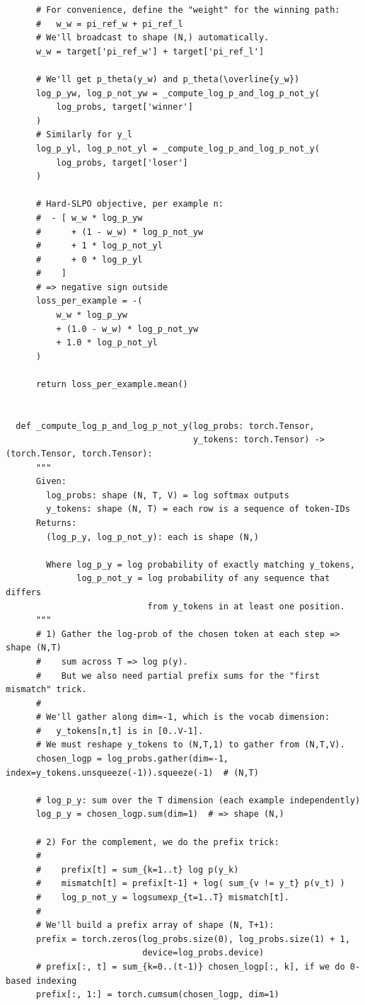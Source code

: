 \documentclass[twoside,11pt]{article}
\begin{document}
\begin{verbatim}
      # For convenience, define the "weight" for the winning path:
      #   w_w = pi_ref_w + pi_ref_l
      # We'll broadcast to shape (N,) automatically.
      w_w = target['pi_ref_w'] + target['pi_ref_l']
  
      # We'll get p_theta(y_w) and p_theta(\overline{y_w}) 
      log_p_yw, log_p_not_yw = _compute_log_p_and_log_p_not_y(
          log_probs, target['winner']
      )
      # Similarly for y_l
      log_p_yl, log_p_not_yl = _compute_log_p_and_log_p_not_y(
          log_probs, target['loser']
      )
  
      # Hard-SLPO objective, per example n:
      #  - [ w_w * log_p_yw
      #      + (1 - w_w) * log_p_not_yw
      #      + 1 * log_p_not_yl
      #      + 0 * log_p_yl
      #    ]
      # => negative sign outside
      loss_per_example = -(
          w_w * log_p_yw
          + (1.0 - w_w) * log_p_not_yw
          + 1.0 * log_p_not_yl
      )
  
      return loss_per_example.mean()
  
  
  def _compute_log_p_and_log_p_not_y(log_probs: torch.Tensor,
                                     y_tokens: torch.Tensor) -> (torch.Tensor, torch.Tensor):
      """
      Given:
        log_probs: shape (N, T, V) = log softmax outputs
        y_tokens: shape (N, T) = each row is a sequence of token-IDs
      Returns:
        (log_p_y, log_p_not_y): each is shape (N,)
  
        Where log_p_y = log probability of exactly matching y_tokens,
              log_p_not_y = log probability of any sequence that differs 
                            from y_tokens in at least one position.
      """
      # 1) Gather the log-prob of the chosen token at each step => shape (N,T)
      #    sum across T => log p(y).
      #    But we also need partial prefix sums for the "first mismatch" trick.
      # 
      # We'll gather along dim=-1, which is the vocab dimension:
      #   y_tokens[n,t] is in [0..V-1].
      # We must reshape y_tokens to (N,T,1) to gather from (N,T,V).
      chosen_logp = log_probs.gather(dim=-1, index=y_tokens.unsqueeze(-1)).squeeze(-1)  # (N,T)
      
      # log_p_y: sum over the T dimension (each example independently)
      log_p_y = chosen_logp.sum(dim=1)  # => shape (N,)
  
      # 2) For the complement, we do the prefix trick:
      #
      #    prefix[t] = sum_{k=1..t} log p(y_k)
      #    mismatch[t] = prefix[t-1] + log( sum_{v != y_t} p(v_t) )
      #    log_p_not_y = logsumexp_{t=1..T} mismatch[t].
      # 
      # We'll build a prefix array of shape (N, T+1):
      prefix = torch.zeros(log_probs.size(0), log_probs.size(1) + 1,
                           device=log_probs.device)
      # prefix[:, t] = sum_{k=0..(t-1)} chosen_logp[:, k], if we do 0-based indexing
      prefix[:, 1:] = torch.cumsum(chosen_logp, dim=1)
  

\end{verbatim}
\end{document}
